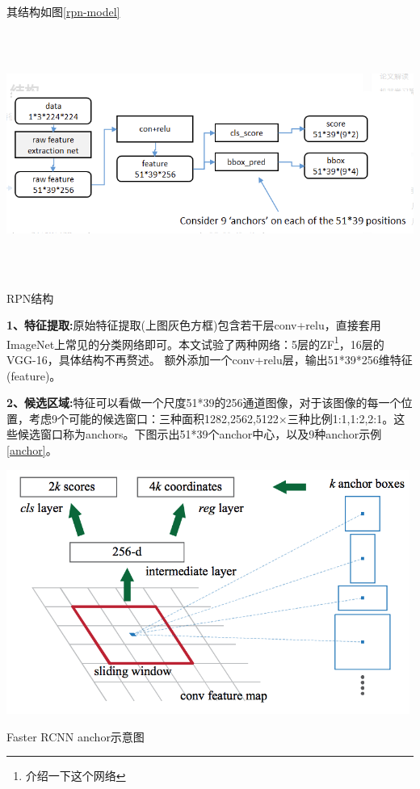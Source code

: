 其结构如图\ref{rpn-model}
\begin{uscfigure}
	\includegraphics[width=\textwidth,height=8cm]{./Pictures/rpn.png}	
	\caption{RPN结构}	
	\label{rpn-model}
\end{uscfigure}

\textbf{1、特征提取:}原始特征提取(上图灰色方框)包含若干层conv+relu，直接套用ImageNet上常见的分类网络即可。本文试验了两种网络：5层的ZF\footnote{介绍一下这个网络}，16层的VGG-16，具体结构不再赘述。 额外添加一个conv+relu层，输出51*39*256维特征(feature)。

\textbf{2、候选区域:}特征可以看做一个尺度51*39的256通道图像，对于该图像的每一个位置，考虑9个可能的候选窗口：三种面积{1282,2562,5122}×三种比例{1:1,1:2,2:1}。这些候选窗口称为anchors。下图示出51*39个anchor中心，以及9种anchor示例\ref{anchor}。
 
\begin{uscfigure}
	\includegraphics[width=\textwidth,height=8cm]{./Pictures/faster_rcnn_anchor.png}	
	\caption{Faster RCNN anchor示意图}	
	\label{anchor}
\end{uscfigure}

